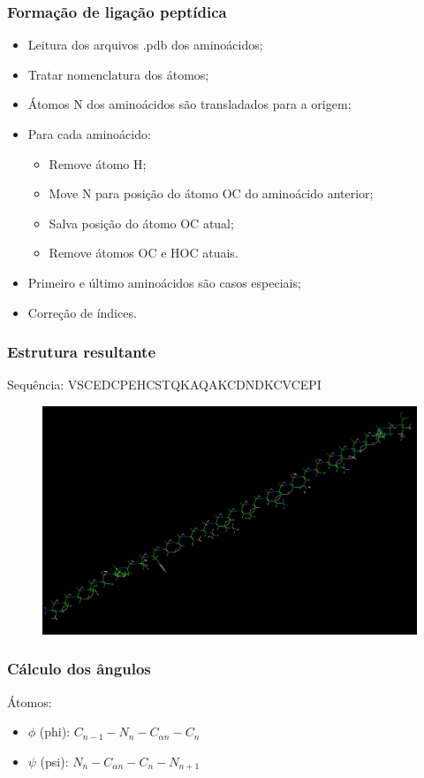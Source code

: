 \documentclass{beamer}
\begin{document}
\begin{frame}
\frametitle{Formação de ligação peptídica}
\begin{itemize}
\item Leitura dos arquivos .pdb dos aminoácidos;
\item Tratar nomenclatura dos átomos;
\item Átomos N dos aminoácidos são transladados para a origem;
\item Para cada aminoácido:
\begin{itemize}
 \item Remove átomo H;
 \item Move N para posição do átomo OC do aminoácido anterior;
 \item Salva posição do átomo OC atual;
 \item Remove átomos OC e HOC atuais.
\end{itemize}
\item Primeiro e último aminoácidos são casos especiais;
\item Correção de índices.
\end{itemize}
\end{frame}

\begin{frame}
\frametitle{Estrutura resultante}
Sequência: VSCEDCPEHCSTQKAQAKCDNDKCVCEPI
\begin{figure}
\includegraphics[width=0.8\linewidth]{protein.png}
\end{figure}
\end{frame}

\begin{frame}
\frametitle{Cálculo dos ângulos}
Átomos:
\begin{itemize}
  \item $\phi$ (phi): $C_{n-1} - N_{n} - C_{\alpha n} - C_{n}$
  \item $\psi$ (psi): $N_{n} - C_{\alpha n} - C_{n} - N_{n+1}$
\end{itemize}
\end{frame}
\end{document}
